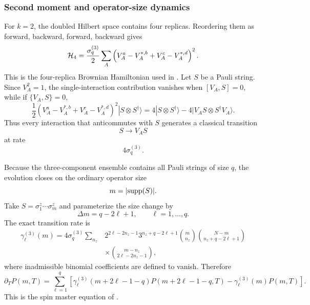\documentclass{article}
\theoremstyle{definition}
\begin{document}
\subsubsection{Second moment and operator-size dynamics}

For $k=2$, the doubled Hilbert space contains four replicas.  Reordering
them as forward, backward, forward, backward gives
\begin{equation}
    {\cal H}_4
    =\frac{\sigma_q^{(3)}}{2}
    \sum_A
    \left(
       V_A^a-V_A^{*,b}+V_A^c-V_A^{*,d}
    \right)^2.
\end{equation}
This is the four-replica Brownian Hamiltonian used in
\cite{xu2025dynamics}.  Let $S$ be a Pauli string.  Since $V_A^2=1$, the
single-interaction contribution vanishes when $[V_A,S]=0$, while if
$\{V_A,S\}=0$,
\begin{equation}
    \frac12
    \left(
       V_A^a-V_A^{*,b}+V_A^c-V_A^{*,d}
    \right)^2
    |S\otimes S^\dagger\rangle
    =4|S\otimes S^\dagger\rangle
     -4|V_AS\otimes S^\dagger V_A\rangle.
\end{equation}
Thus every interaction that anticommutes with $S$ generates a classical
transition
\begin{equation}
    S\longrightarrow V_AS
\end{equation}
at rate
\begin{equation}
    4\sigma_q^{(3)}.
\end{equation}

Because the three-component ensemble contains all Pauli strings of size
$q$, the evolution closes on the ordinary operator size
\begin{equation}
    m=|{\rm supp}(S)|.
\end{equation}
Take $S=\sigma_1^z\cdots\sigma_m^z$ and parameterize the size change by
\begin{equation}
    \Delta m=q-2\ell+1,
    \qquad \ell=1,\ldots,q.
\end{equation}
The exact transition rate is
\begin{align}
    \gamma_\ell^{(3)}(m)
    =4\sigma_q^{(3)}\sum_{n_z}
    &2^{2\ell-2n_z-1}
     3^{n_z+q-2\ell+1}
     \binom{m}{n_z}
     \binom{N-m}{n_z+q-2\ell+1}
    \nonumber\\
    &\times
     \binom{m-n_z}{2\ell-2n_z-1},
\end{align}
where inadmissible binomial coefficients are defined to vanish.  Therefore
\begin{equation}
    \partial_TP(m,T)
    =\sum_{\ell=1}^q
    \left[
       \gamma_\ell^{(3)}(m+2\ell-1-q)
       P(m+2\ell-1-q,T)
       -\gamma_\ell^{(3)}(m)P(m,T)
    \right].
\end{equation}
This is the spin master equation of \cite{xu2025dynamics}.
\end{document}
